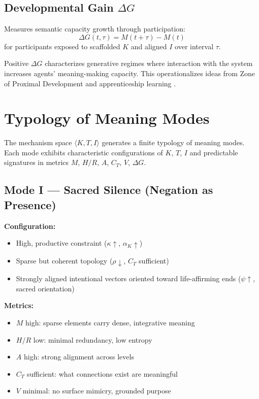\documentclass[12pt]{article}
\begin{document}
\subsection{Developmental Gain $\Delta G$}

Measures semantic capacity growth through participation:
\[
\Delta G(t, \tau) = M(t+\tau) - M(t)
\]
for participants exposed to scaffolded $K$ and aligned $I$ over interval $\tau$.

Positive $\Delta G$ characterizes generative regimes where interaction with the system increases agents' meaning-making capacity. This operationalizes ideas from Zone of Proximal Development \citep{vygotsky1978mind} and apprenticeship learning \citep{lave1991situated}.

\section{Typology of Meaning Modes}
\label{sec:typology}

The mechanism space $\langle K, T, I \rangle$ generates a finite typology of meaning modes. Each mode exhibits characteristic configurations of $K$, $T$, $I$ and predictable signatures in metrics $M$, $H/R$, $A$, $C_T$, $V$, $\Delta G$.

\subsection{Mode I — Sacred Silence (Negation as Presence)}

\textbf{Configuration:}
\begin{itemize}
\item High, productive constraint ($\kappa \uparrow$, $\alpha_K \uparrow$)
\item Sparse but coherent topology ($\rho \downarrow$, $C_T$ sufficient)
\item Strongly aligned intentional vectors oriented toward life-affirming ends ($\psi \uparrow$, sacred orientation)
\end{itemize}

\textbf{Metrics:}
\begin{itemize}
\item $M$ high: sparse elements carry dense, integrative meaning
\item $H/R$ low: minimal redundancy, low entropy
\item $A$ high: strong alignment across levels
\item $C_T$ sufficient: what connections exist are meaningful
\item $V$ minimal: no surface mimicry, grounded purpose
\end{itemize}
\end{document}
